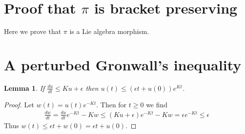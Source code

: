 \documentclass[12pt]{amsart}
\newtheorem{lem}[thm]{Lemma}
\begin{document}
\section{Proof that $\pi$ is bracket preserving} \label{app:Lie}
Here we prove that $\pi$ is a Lie algebra morphism.

\section{A perturbed Gronwall's inequality}
\begin{lem} \label{lem:Gronwall}
If $\frac{du}{dt} \leq Ku + \epsilon$ then $u(t) \leq (\epsilon t + u(0) ) e^{Kt}$.
\end{lem}
\begin{proof}
	Let $w (t)= u (t) e^{-Kt}$.  Then for $t \geq 0$ we find
	\begin{align}
		\frac{dw}{dt} = \frac{du}{dt} e^{-Kt} - K w \leq (Ku+\epsilon) e^{-Kt} - Kw = \epsilon e^{-Kt} \leq \epsilon
	\end{align}
	Thus $w(t) \leq \epsilon t + w(0) = \epsilon t + u(0)$.
\end{proof}



\end{document}
